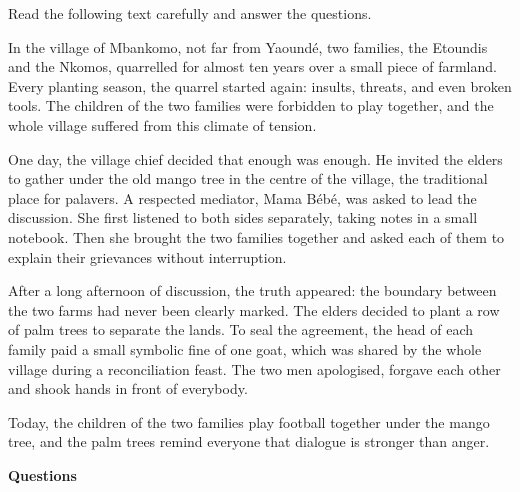 \documentclass[11pt]{article}
\begin{document}
\begin{exercice}
Read the following text carefully and answer the questions.

\begin{textebox}
In the village of Mbankomo, not far from Yaoundé, two families, the Etoundis and the Nkomos, quarrelled for almost ten years over a small piece of farmland. Every planting season, the quarrel started again: insults, threats, and even broken tools. The children of the two families were forbidden to play together, and the whole village suffered from this climate of tension.

One day, the village chief decided that enough was enough. He invited the elders to gather under the old mango tree in the centre of the village, the traditional place for palavers. A respected mediator, Mama Bébé, was asked to lead the discussion. She first listened to both sides separately, taking notes in a small notebook. Then she brought the two families together and asked each of them to explain their grievances without interruption.

After a long afternoon of discussion, the truth appeared: the boundary between the two farms had never been clearly marked. The elders decided to plant a row of palm trees to separate the lands. To seal the agreement, the head of each family paid a small symbolic fine of one goat, which was shared by the whole village during a reconciliation feast. The two men apologised, forgave each other and shook hands in front of everybody.

Today, the children of the two families play football together under the mango tree, and the palm trees remind everyone that dialogue is stronger than anger.
\end{textebox}

\textbf{Questions}


\end{exercice}
\end{document}
